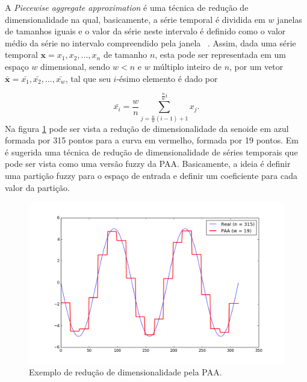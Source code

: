 A \emph{Piecewise aggregate approximation} é uma técnica de redução de dimensionalidade na qual, basicamente, a série temporal é dividida em $w$ janelas de tamanhos iguais e o valor da série neste intervalo é definido como o valor médio da série no intervalo compreendido pela janela ~\parencite{SAX}. Assim, dada uma série temporal $\bm{x} = x_1,x_2,...,x_n$ de tamanho $n$, esta pode ser representada em  um espaço $w$ dimensional, sendo $w<n$ e $w$ múltiplo inteiro de $n$, por um vetor $\bm{\bar{x}} =\bar{x_1},\bar{x_2},...,\bar{x_w} $, tal que seu $i$-ésimo elemento é dado por

\begin{equation}
	\bar{x_i} = \frac{w}{n} \sum_{j=\frac{n}{w}(i-1)+1}^{\frac{n}{w}i} x_j.
\end{equation}
Na figura \ref{fig:PAA} pode ser vista a redução de dimensionalidade da senoide em azul formada por 315 pontos para a curva em vermelho, formada por 19 pontos. Em ~\parencite{fuzzy_transform} é sugerida uma técnica de redução de dimensionalidade de séries temporais que pode ser vista como uma versão fuzzy da PAA. Basicamente, a ideia é definir uma partição fuzzy para o espaço de entrada e definir um coeficiente para cada valor da partição.

\begin{figure}[h!]
	\includegraphics[width=\linewidth]{figuras/PAA.png}
	\caption{Exemplo de redução de dimensionalidade pela PAA.}
	\label{fig:PAA}
\end{figure}




